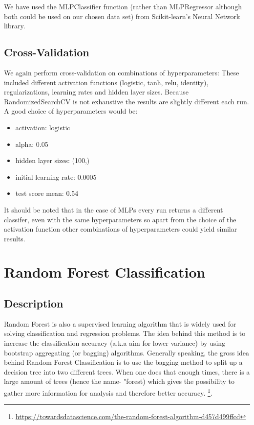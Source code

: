 \documentclass[twocolumn]{scrartcl}
\begin{document}
We have used the MLPClassifier function (rather than MLPRegressor although both could be used on our chosen data set) from Scikit-learn's Neural Network library.

\subsection{Cross-Validation}
We again perform cross-validation on combinations of hyperparameters: These included different activation functions (logistic, tanh, relu, identity), regularizations, learning rates and hidden layer sizes. Because RandomizedSearchCV is not exhaustive the results are slightly different each run. A good choice of hyperparameters would be:
\begin{itemize}
    \item{activation: logistic}
    \item{alpha: 0.05}
    \item{hidden layer sizes: (100,)}
    \item{initial learning rate: 0.0005}
    \item{test score mean: 0.54}
\end{itemize}
It should be noted that in the case of MLPs every run returns a different classifer, even with the same hyperparameters so apart from the choice of the activation function other combinations of hyperparameters could yield similar results.

\section{Random Forest Classification}
\subsection{Description}
Random Forest is also a supervised learning algorithm that is widely used for solving classification and regression problems. The idea behind this method is to increase the classification accuracy (a.k.a aim for lower variance) by using bootstrap aggregating (or bagging) algorithms. Generally speaking, the gross idea behind Random Forest Classification is to use the bagging method to split up a decision tree into two different trees. When one does that enough times, there is a large amount of trees (hence the name- "forest) which gives the possibility to gather more information for analysis and therefore better accuracy. \footnote{\url{https://towardsdatascience.com/the-random-forest-algorithm-d457d499ffcd}}.
\end{document}
